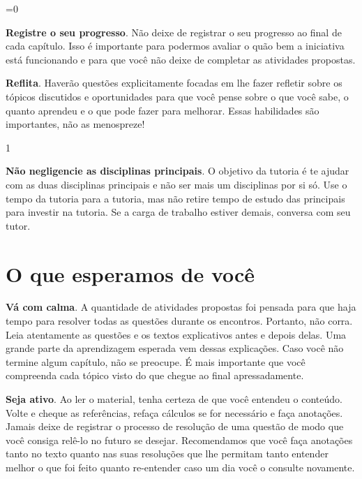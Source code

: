 {\ifnum{}=0
%
\fi

\textbf{Registre o seu progresso}. Não deixe de registrar o seu progresso ao final de cada capítulo. Isso é importante para podermos avaliar o quão bem a iniciativa está funcionando e para que você não deixe de completar as atividades propostas.

\textbf{Reflita}. Haverão questões explicitamente focadas em lhe fazer refletir sobre os tópicos discutidos e oportunidades para que você pense sobre o que você sabe, o quanto aprendeu e o que pode fazer para melhorar. Essas habilidades são importantes, não as menospreze! 

1                                                            \tab 


\textbf{Não negligencie as disciplinas principais}. O objetivo da tutoria é te ajudar com as duas disciplinas principais e não ser mais um disciplinas por si só. Use o tempo da tutoria para a tutoria, mas não retire tempo de estudo das principais para investir na tutoria. Se a carga de trabalho estiver demais, conversa com seu tutor.


\section{O que esperamos de você}

\textbf{Vá com calma}. A quantidade de atividades propostas foi pensada para que haja tempo para resolver todas as questões durante os encontros. Portanto, não corra. Leia atentamente as questões e os textos explicativos antes e depois delas. Uma grande parte da aprendizagem esperada vem dessas explicações. Caso você não termine algum capítulo, não se preocupe. É mais importante que você compreenda cada tópico visto do que chegue ao final apressadamente.
 
 \textbf{Seja ativo}. Ao ler o material, tenha certeza de que você entendeu o conteúdo. Volte e cheque as referências, refaça cálculos se for necessário e faça anotações. Jamais deixe de registrar o processo de resolução de uma questão de modo que você consiga relê-lo no futuro se desejar. Recomendamos que você faça anotações tanto no texto quanto nas suas resoluções que lhe permitam tanto entender  melhor o que foi feito quanto re-entender caso um dia você o consulte novamente. 

}
